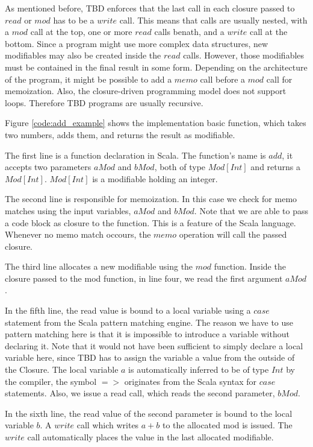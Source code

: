 As mentioned before, TBD enforces that the last call in each closure passed to $read$ or $mod$ has to be a $write$ call. This means that calls are usually nested, with a $mod$ call at the top, one or more $read$ calls benath, and a $write$ call at the bottom. Since a program might use more complex data structures, new modifiables may also be created inside the $read$ calls. However, those modifiables must be contained in the final result in some form. Depending on the architecture of the program, it might be possible to add a $memo$ call before a $mod$ call for memoization. Also, the closure-driven programming model does not support loops. Therefore TBD programs are usually recursive. 

Figure \ref{code:add_example} shows the implementation basic function, which takes two numbers, adds them, and returns the result as modifiable. 

The first line is a function declaration in Scala. The function's name is $add$, it accepts two parameters $aMod$ and $bMod$, both of type $Mod[Int]$ and returns a $Mod[Int]$. $Mod[Int]$ is a modifiable holding an integer. 

The second line is responsible for memoization. In this case we check for memo matches using the input variables, $aMod$ and $bMod$. Note that we are able to pass a code block as closure to the function. This is a feature of the Scala language. Whenever no memo match occours, the $memo$ operation will call the passed closure. 

The third line allocates a new modifiable using the $mod$ function. Inside the closure passed to the mod function, in line four, we read the first argument $aMod$. 

In the fifth line, the read value is bound to a local variable using a $case$ statement from the Scala pattern matching engine. The reason we have to use pattern matching here is that it is impossible to introduce a variable without declaring it. Note that it would not have been sufficient to simply declare a local variable here, since TBD has to assign the variable a value from the outside of the Closure. The local variable $a$ is automatically inferred to be of type $Int$ by the compiler, the symbol $=>$ originates from the Scala syntax for $case$ statements. Also, we issue a read call, which reads the second parameter, $bMod$.

In the sixth line, the read value of the second parameter is bound to the local variable $b$. A $write$ call which writes $a + b$ to the allocated mod is issued. The $write$ call automatically places the value in the last allocated modifiable. 


